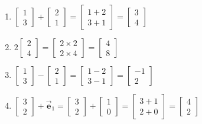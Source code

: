 \documentclass{article}
\begin{document}
\begin{enumerate}
\item
$
\begin{bmatrix}1\\3\end{bmatrix}
+
\begin{bmatrix}2\\1\end{bmatrix}=
\begin{bmatrix}1+2\\3+1\end{bmatrix}=
\begin{bmatrix}3\\4\end{bmatrix}
$

\item
$
2\begin{bmatrix}2\\4\end{bmatrix}=
\begin{bmatrix}2 \times 2\\2 \times 4\end{bmatrix}=
\begin{bmatrix}4\\8\end{bmatrix}
$

\item
$
\begin{bmatrix}1\\3\end{bmatrix}
-
\begin{bmatrix}2\\1\end{bmatrix}=
\begin{bmatrix}1-2\\3-1\end{bmatrix}=
\begin{bmatrix}-1\\2\end{bmatrix}
$

\item
$
\begin{bmatrix}3\\2\end{bmatrix} + \vec{\mathbf{e}}_1=
\begin{bmatrix}3\\2\end{bmatrix}
+
\begin{bmatrix}1\\0\end{bmatrix}=
\begin{bmatrix}3+1\\2+0\end{bmatrix}=
\begin{bmatrix}4\\2\end{bmatrix}
$
\end{enumerate}
\end{document}
